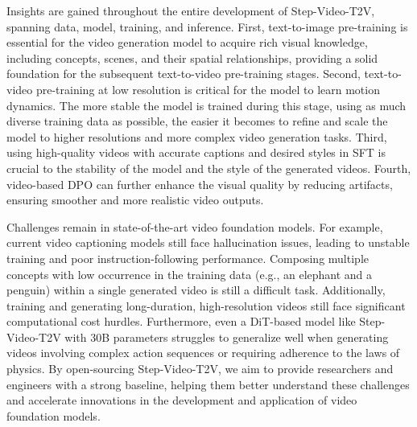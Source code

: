 Insights are gained throughout the entire development of Step-Video-T2V, spanning data, model, training, and inference. First, text-to-image pre-training is essential for the video generation model to acquire rich visual knowledge, including concepts, scenes, and their spatial relationships, providing a solid foundation for the subsequent text-to-video pre-training stages. Second, text-to-video pre-training at low resolution is critical for the model to learn motion dynamics. The more stable the model is trained during this stage, using as much diverse training data as possible, the easier it becomes to refine and scale the model to higher resolutions and more complex video generation tasks. Third, using high-quality videos with accurate captions and desired styles in SFT is crucial to the stability of the model and the style of the generated videos. Fourth, video-based DPO can further enhance the visual quality by reducing artifacts, ensuring smoother and more realistic video outputs.

Challenges remain in state-of-the-art video foundation models. For example, current video captioning models still face hallucination issues, leading to unstable training and poor instruction-following performance. Composing multiple concepts with low occurrence in the training data (e.g., an elephant and a penguin) within a single generated video is still a difficult task. Additionally, training and generating long-duration, high-resolution videos still face significant computational cost hurdles. Furthermore, even a DiT-based model like Step-Video-T2V with 30B parameters struggles to generalize well when generating videos involving complex action sequences or requiring adherence to the laws of physics. By open-sourcing Step-Video-T2V, we aim to provide researchers and engineers with a strong baseline, helping them better understand these challenges and accelerate innovations in the development and application of video foundation models.


